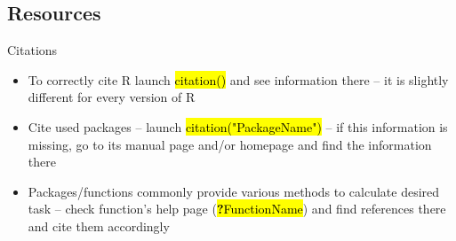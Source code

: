 \documentclass[compress, ucs, xelatex, 11pt, xcolor=svgnames,
  hyperref={
    bookmarks=true,
    unicode=true,
    colorlinks=true,
    pdftitle={Molecular data in R},
    plainpages=false,
    pdfauthor={Vojtech Zeisek},
    pdfsubject={Course about phylogeny and evolution in R},
    pdfcreator={XeLaTeX},
    pdfkeywords={R, evolution, phylogeny, molecular data},
    linkcolor=Tomato,
    anchorcolor=SaddleBrown,
    citecolor=Goldenrod,
    filecolor=DarkMagenta,
    menucolor=Sienna,
    urlcolor=DarkTurquoise,
    pdftex},
  url={hyphens, lowtilde} %
  ]{beamer}
\renewcommand{\texttt}[1]{\hl{\ttfamily #1}}
\begin{document}
\subsection{Resources}

\begin{frame}{Citations}
\begin{itemize}
  \item To correctly cite R launch \texttt{citation()} and see information there -- it is slightly different for every version of R
  \item Cite used packages -- launch \texttt{citation("PackageName")} -- if this information is missing, go to its manual page and/or homepage and find the information there
  \item Packages/functions commonly provide various methods to calculate desired task -- check function's help page (\texttt{\textbf{?}FunctionName}) and find references there and cite them accordingly
\end{itemize}
\end{frame}
\end{document}
